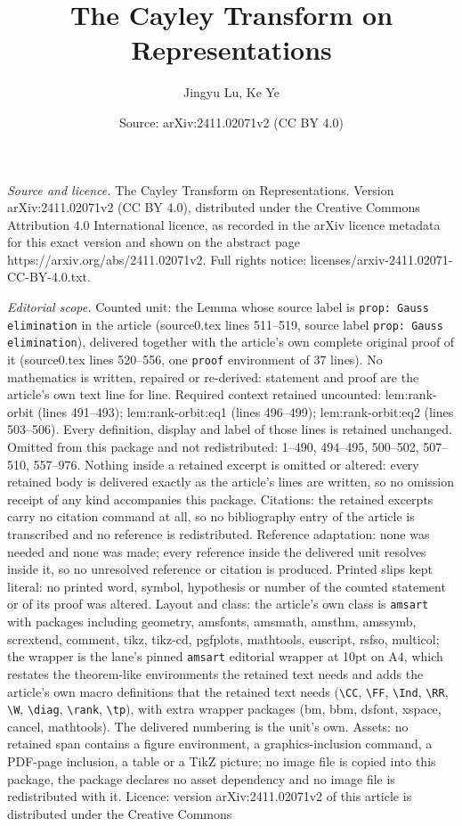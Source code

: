 \documentclass[10pt,a4paper]{amsart}
\title[The Cayley Transform on Representations]{The Cayley Transform on Representations}
\author{Jingyu Lu, Ke Ye}
\date{Source: arXiv:2411.02071v2 (CC BY 4.0)}
\begin{document}
\maketitle

\noindent\emph{Source and licence.} The Cayley Transform on Representations. Version arXiv:2411.02071v2 (CC BY 4.0), distributed under the Creative Commons Attribution 4.0 International licence, as recorded in the arXiv licence metadata for this exact version and shown on the abstract page https://arxiv.org/abs/2411.02071v2. Full rights notice: licenses/arxiv-2411.02071-CC-BY-4.0.txt.\par\smallskip

\noindent\textit{Editorial scope.} Counted unit: the Lemma whose source label is \texttt{prop: Gauss elimination} in the article (source0.tex lines 511--519, source label \texttt{prop: Gauss elimination}), delivered together with the article's own complete original proof of it (source0.tex lines 520--556, one \texttt{proof} environment of 37 lines). No mathematics is written, repaired or re-derived: statement and proof are the article's own text line for line. Required context retained uncounted: lem:rank-orbit (lines 491--493); lem:rank-orbit:eq1 (lines 496--499); lem:rank-orbit:eq2 (lines 503--506). Every definition, display and label of those lines is retained unchanged. Omitted from this package and not redistributed: 1--490, 494--495, 500--502, 507--510, 557--976. Nothing inside a retained excerpt is omitted or altered: every retained body is delivered exactly as the article's lines are written, so no omission receipt of any kind accompanies this package. Citations: the retained excerpts carry no citation command at all, so no bibliography entry of the article is transcribed and no reference is redistributed. Reference adaptation: none was needed and none was made; every reference inside the delivered unit resolves inside it, so no unresolved reference or citation is produced. Printed slips kept literal: no printed word, symbol, hypothesis or number of the counted statement or of its proof was altered. Layout and class: the article's own class is \texttt{amsart} with packages including geometry, amsfonts, amsmath, amsthm, amssymb, scrextend, comment, tikz, tikz-cd, pgfplots, mathtools, euscript, rsfso, multicol; the wrapper is the lane's pinned \texttt{amsart} editorial wrapper at 10pt on A4, which restates the theorem-like environments the retained text needs and adds the article's own macro definitions that the retained text needs (\texttt{\textbackslash CC}, \texttt{\textbackslash FF}, \texttt{\textbackslash Ind}, \texttt{\textbackslash RR}, \texttt{\textbackslash W}, \texttt{\textbackslash diag}, \texttt{\textbackslash rank}, \texttt{\textbackslash tp}), with extra wrapper packages (bm, bbm, dsfont, xspace, cancel, mathtools). The delivered numbering is the unit's own. Assets: no retained span contains a figure environment, a graphics-inclusion command, a PDF-page inclusion, a table or a TikZ picture; no image file is copied into this package, the package declares no asset dependency and no image file is redistributed with it. Licence: version arXiv:2411.02071v2 of this article is distributed under the Creative Commons 
\end{document}
